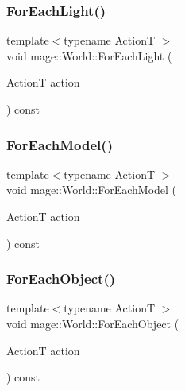 \subsubsection{\texorpdfstring{For\+Each\+Light()}{ForEachLight()}}
{\footnotesize\ttfamily template$<$typename ActionT $>$ \\
void mage\+::\+World\+::\+For\+Each\+Light (\begin{DoxyParamCaption}\item[{ActionT}]{action }\end{DoxyParamCaption}) const}

\hypertarget{classmage_1_1_world_a8f9c130a358f6ce687d2948f477d4ef2}{}\label{classmage_1_1_world_a8f9c130a358f6ce687d2948f477d4ef2} 
\subsubsection{\texorpdfstring{For\+Each\+Model()}{ForEachModel()}}
{\footnotesize\ttfamily template$<$typename ActionT $>$ \\
void mage\+::\+World\+::\+For\+Each\+Model (\begin{DoxyParamCaption}\item[{ActionT}]{action }\end{DoxyParamCaption}) const}

\hypertarget{classmage_1_1_world_a9bb9af95395546e334609473dda0854c}{}\label{classmage_1_1_world_a9bb9af95395546e334609473dda0854c} 
\subsubsection{\texorpdfstring{For\+Each\+Object()}{ForEachObject()}}
{\footnotesize\ttfamily template$<$typename ActionT $>$ \\
void mage\+::\+World\+::\+For\+Each\+Object (\begin{DoxyParamCaption}\item[{ActionT}]{action }\end{DoxyParamCaption}) const}

\hypertarget{classmage_1_1_world_ae8293799bc02d12c7a48e248bcc3eb33}{}\label{classmage_1_1_world_ae8293799bc02d12c7a48e248bcc3eb33} 
